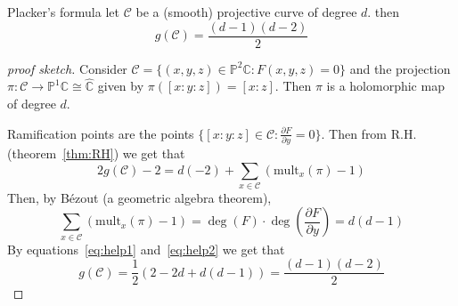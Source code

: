 \begin{theorem}{Placker's formula}
    let \(\mathcal{C}\) be a (smooth) projective curve of degree \(d\).
    then \[g{(\mathcal{C})} = \frac{{(d-1)}{(d-2)}}{2}\] 
\end{theorem}
\begin{proof}[proof sketch]
    Consider \(\mathcal{C} = \{{(x, y, z)} \in  \mathbb{P}^2\mathbb{C} : F{(x,
    y, z)} = 0\} \) and the projection \(\pi : \mathcal{C} \to
    \mathbb{P}^{1}\mathbb{C} \cong \widehat{\mathbb{C}}\) given by \(\pi{([x : y
    : z])} = [x : z]\). Then \(\pi\) is a holomorphic map of degree \(d\).

    Ramification points are the points \(\{[x : y : z] \in \mathcal{C} :
    \frac{\partial F}{\partial y} = 0\} \). Then from R.H. (theorem~\ref{thm:RH})
    we get that 
    \begin{equation}\label{eq:help1}
      2g{(\mathcal{C})} - 2 = d{(-2)} + \sum_{x \in \mathcal{C}} {\left(
      \mathrm{mult}_x{(\pi)} -1 \right)} 
    \end{equation}
    Then, by Bézout (a geometric algebra theorem),
    \begin{equation}\label{eq:help2}
      \sum_{x \in  \mathcal{C}} {\left( \mathrm{mult}_x{(\pi)} -1 \right)} =
      \deg {(F)} \cdot \deg {\left( \frac{\partial F}{\partial y} \right)} = d
      {(d-1)}
    \end{equation}
    By equations~\eqref{eq:help1} and~\eqref{eq:help2} we get that
    \[
      g{(\mathcal{C})} = \frac{1}{2} {\left( 2 - 2d + d{(d-1)} \right)} =
      \frac{{(d-1)}{(d-2)}}{2}
    \]
\end{proof}

